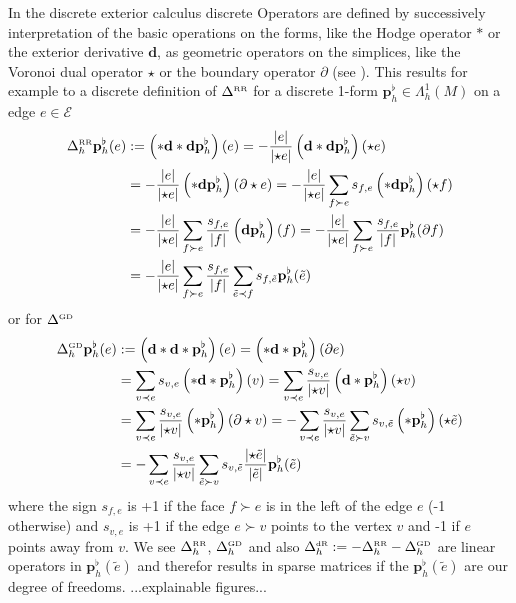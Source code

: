 \documentclass[a4paper,11pt]{scrartcl}
\newcommand{\exd}{\mathbf{d}}
\newcommand{\pflh}{\mathbf{p}^{\flat}_{h}}
\newcommand{\LB}{\Delta^{\text{\tiny RR}}}
\newcommand{\LCB}{\Delta^{\text{\tiny GD}}}
\newcommand{\LDR}{\Delta^{\text{\tiny dR}}}
\newcommand{\LBh}{\LB_{h}}
\newcommand{\LCBh}{\LCB_{h}}
\newcommand{\LDRh}{\LDR_{h}}
\newcommand{\E}{\mathcal{E}}
\begin{document}
    In the discrete exterior calculus discrete Operators are defined by successively interpretation of the basic operations on the forms, 
    like the Hodge operator \( * \) or the exterior derivative \( \exd \), as geometric operators on the simplices, 
    like the Voronoi dual operator \( \star \) or the boundary operator \( \partial \) (see \cite{hirani}).
    This results for example to a discrete definition of \( \LB \) for a discrete 1-form \( \pflh\in\Lambda^{1}_{h}(M) \) on a edge 
    \(e\in\E \)
    \begin{align}
      \LBh\pflh(e) &:=  \left(*\exd*\exd \pflh\right)(e)
                     = -\frac{\left| e \right|}{\left| \star e \right|} \left(\exd * \exd  \pflh\right)(\star e) \\
                    &=  -\frac{\left| e \right|}{\left| \star e \right|} \left(* \exd  \pflh\right)(\partial\star e)
                     = -\frac{\left| e \right|}{\left| \star e \right|} \sum_{f\succ e} s_{f,e} \left(* \exd \pflh\right) (\star f) \\
                    &= -\frac{\left| e \right|}{\left| \star e \right|} \sum_{f\succ e} \frac{s_{f,e}}{\left| f \right|} 
                                \left(\exd\pflh\right)(f)
                     = -\frac{\left| e \right|}{\left| \star e \right|} \sum_{f\succ e} \frac{s_{f,e}}{\left| f \right|} \pflh(\partial f)\\
                    &= -\frac{\left| e \right|}{\left| \star e \right|} \sum_{f\succ e} \frac{s_{f,e}}{\left| f \right|}
                                \sum_{\tilde{e}\prec f} s_{f,\tilde{e}} \pflh(\tilde{e})
    \end{align}
    or for \( \LCB \)
    \begin{align}
      \LCBh\pflh(e) &:= \left( \exd * \exd * \pflh\right) (e)
                      = \left( * \exd *\pflh \right) (\partial e) \\
                     &= \sum_{v\prec e} s_{v,e} \left( * \exd * \pflh \right)(v) 
                      = \sum_{v\prec e} \frac{s_{v,e}}{\left| \star v \right|} \left( \exd * \pflh \right)(\star v)\\
                     &= \sum_{v\prec e} \frac{s_{v,e}}{\left| \star v \right|} \left( * \pflh \right)(\partial\star v)
                      = -\sum_{v\prec e} \frac{s_{v,e}}{\left| \star v \right|} \sum_{\tilde{e}\succ v}
                                s_{v,\tilde{e}} \left( * \pflh \right) (\star \tilde{e}) \\
                     &= -\sum_{v\prec e} \frac{s_{v,e}}{\left| \star v \right|} \sum_{\tilde{e}\succ v}
                                s_{v,\tilde{e}} \frac{\left| \star\tilde{e} \right|}{\left| \tilde{e} \right|}\pflh(\tilde{e})
    \end{align}
    where the sign \( s_{f,e} \) is +1 if the face \( f\succ e \) is in the left of the edge \( e \) (-1 otherwise)
    and \( s_{v,e} \) is +1 if the edge \( e\succ v \) points to the vertex \( v \) and -1 if \( e \) points away from \( v \).
    We see \( \LBh \), \( \LCBh \) and also \( \LDRh := -\LBh -\LCBh \) are linear operators in \( \pflh(\tilde{e}) \)
    and therefor results in sparse matrices if the \( \pflh(\tilde{e}) \) are our degree of freedoms.
    ...explainable figures...
\end{document}
